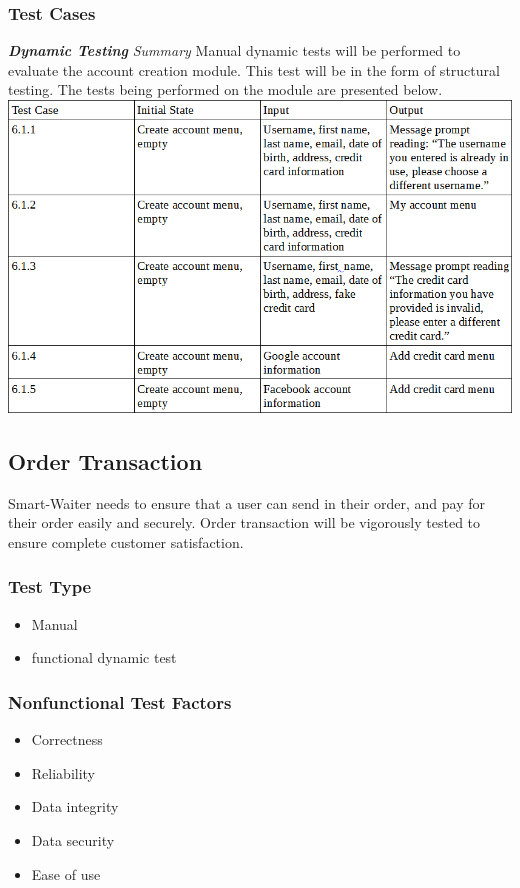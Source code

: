 \documentclass[12pt]{article}
\begin{document}
\subsubsection{Test Cases}
\textbf{\textit{Dynamic Testing}}\newline
\newline
\textit{Summary}\newline
Manual dynamic tests will be performed to evaluate the account creation module. This test will be in the form of structural testing. The tests being performed on the module are presented below. 
\newline
\includegraphics[width=\textwidth,height=\textheight,keepaspectratio]{accountTC.png}


\subsection{Order Transaction}
Smart-Waiter needs to ensure that a user can send in their order, and pay for their order easily and securely. Order transaction will be vigorously tested to ensure complete customer satisfaction.  
\subsubsection{Test Type}
\begin{itemize}
  \item Manual 
  \item functional dynamic test 
 \end{itemize} 
\subsubsection{Nonfunctional Test Factors}
\begin{itemize}
  \item Correctness 
  \item Reliability 
  \item Data integrity 
  \item Data security 
  \item Ease of use
 \end{itemize} 
\end{document}

